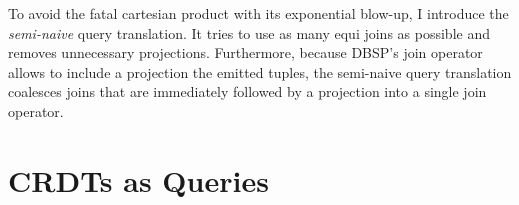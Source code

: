 To avoid the fatal cartesian product with its exponential blow-up,
I introduce the \emph{semi-naive} query translation.
It tries to use as many equi joins as possible and removes unnecessary projections.
Furthermore, because DBSP's join operator allows to include a projection the
emitted tuples,
the semi-naive query translation coalesces joins that are immediately followed
by a projection into a single join operator.




\section{\acp{CRDT} as Queries}\label{sec:crdts-as-queries}

